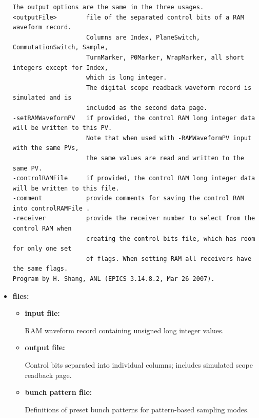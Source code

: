 \begin{itemize}
\begin{verbatim}
The output options are the same in the three usages.
<outputFile>        file of the separated control bits of a RAM waveform record. 
                    Columns are Index, PlaneSwitch, CommutationSwitch, Sample, 
                    TurnMarker, P0Marker, WrapMarker, all short integers except for Index, 
                    which is long integer.
                    The digital scope readback waveform record is simulated and is 
                    included as the second data page. 
-setRAMWaveformPV   if provided, the control RAM long integer data will be written to this PV. 
                    Note that when used with -RAMWaveformPV input with the same PVs, 
                    the same values are read and written to the same PV. 
-controlRAMFile     if provided, the control RAM long integer data will be written to this file. 
-comment            provide comments for saving the control RAM into controlRAMFile .
-receiver           provide the receiver number to select from the control RAM when
                    creating the control bits file, which has room for only one set
                    of flags. When setting RAM all receivers have the same flags.
Program by H. Shang, ANL (EPICS 3.14.8.2, Mar 26 2007).

\end{verbatim}
\normalsize

\item {\bf files:}
\begin{itemize}
\item {\bf input file:} \par
  RAM waveform record containing unsigned long integer values.
\item {\bf output file:} \par
  Control bits separated into individual columns; includes simulated scope readback page.
\item {\bf bunch pattern file:} \par
  Definitions of preset bunch patterns for pattern-based sampling modes.


\end{itemize}
\end{itemize}
